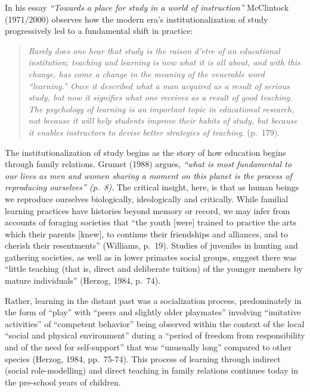 \documentclass[
]{book}
\begin{document}
In his essay \emph{``Towards a place for study in a world of instruction''} McClintock (1971/2000) observes how the modern era's institutionalization of study progressively led to a fundamental shift in practice:

\begin{quote}
\emph{Rarely does one hear that study is the raison d'etre of an educational institution; teaching and learning is now what it is all about, and with this change, has come a change in the meaning of the venerable word ``learning.'' Once it described what a man acquired as a result of serious study, but now it signifies what one receives as a result of good teaching. The psychology of learning is an important topic in educational research, not because it will help students improve their habits of study, but because it enables instructors to devise better strategies of teaching.} (p.~179).
\end{quote}

The institutionalization of study begins as the story of how education begins through family relations. Grumet (1988) argues, \emph{``what is most fundamental to our lives as men and women sharing a moment on this planet is the process of reproducing ourselves'' (p.~8)}. The critical insight, here, is that as human beings we reproduce ourselves biologically, ideologically and critically. While familial learning practices have histories beyond memory or record, we may infer from accounts of foraging societies that ``the youth {[}were{]} trained to practice the arts which their parents {[}knew{]}, to continue their friendships and alliances, and to cherish their resentments'' (Williams, p.~19). Studies of juveniles in hunting and gathering societies, as well as in lower primates social groups, suggest there was ``little teaching (that is, direct and deliberate tuition) of the younger members by mature individuals'' (Herzog, 1984, p.~74).

Rather, learning in the distant past was a socialization process, predominately in the form of ``play'' with ``peers and slightly older playmates'' involving ``imitative activities'' of ``competent behavior'' being observed within the context of the local ``social and physical environment'' during a ``period of freedom from responsibility and of the need for self-support'' that was ``unusually long'' compared to other species (Herzog, 1984, pp.~75-74). This process of learning through indirect (social role-modelling) and direct teaching in family relations continues today in the pre-school years of children.
\end{document}
